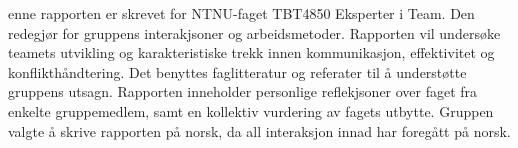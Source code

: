 enne rapporten er skrevet for NTNU-faget TBT4850 Eksperter i Team.
Den redegjør for gruppens interakjsoner og arbeidsmetoder. 
Rapporten vil undersøke teamets utvikling og karakteristiske trekk innen kommunikasjon, effektivitet og konflikthåndtering.
Det benyttes faglitteratur og referater til å understøtte gruppens utsagn. 
Rapporten inneholder personlige reflekjsoner over faget fra enkelte gruppemedlem, samt en kollektiv vurdering av fagets utbytte. 
Gruppen valgte å skrive rapporten på norsk, da all interaksjon innad har foregått på norsk. 
